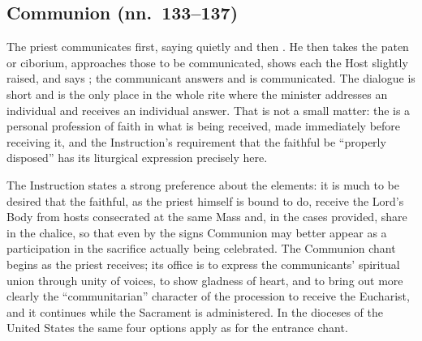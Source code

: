 \subsection{Communion (nn.\ 133--137)}

The priest communicates first, saying quietly  and then . He then takes the
paten or ciborium, approaches those to be communicated, shows each the Host slightly raised, and
says ; the communicant answers  and is
communicated. The dialogue is short and is the only place in the whole rite where
the minister addresses an individual and receives an individual answer. That is not a small
matter: the  is a personal profession of faith in what is being received, made
immediately before receiving it, and the Instruction's requirement that the faithful be
``properly disposed'' has its liturgical expression precisely here.

The Instruction states a strong preference about the elements: it is much to be desired that the
faithful, as the priest himself is bound to do, receive the Lord's Body from hosts consecrated
at the same Mass and, in the cases provided, share in the chalice, so that even by the signs
Communion may better appear as a participation in the sacrifice actually being
celebrated. The Communion chant begins as the priest receives; its
office is to express the communicants' spiritual union through unity of voices, to show
gladness of heart, and to bring out more clearly the ``communitarian'' character of the
procession to receive the Eucharist, and it continues while the Sacrament is administered. In
the dioceses of the United States the same four options apply as for the entrance
chant.

